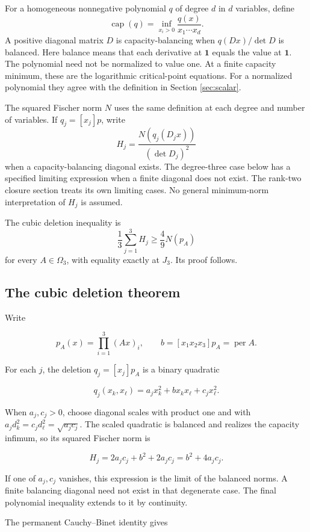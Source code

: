 \documentclass[11pt,a4paper]{article}
\theoremstyle{definition}
\theoremstyle{remark}
\begin{document}
For a homogeneous nonnegative polynomial \(q\) of degree \(d\) in \(d\)
variables, define \[
 \operatorname{cap}(q)=\inf_{x_i>0}\frac{q(x)}{x_1\cdots x_d}.
\] A positive diagonal matrix \(D\) is capacity-balancing when
\(q(Dx)/\det D\) is balanced. Here balance means that each derivative at
\(\mathbf1\) equals the value at \(\mathbf1\). The polynomial need not
be normalized to value one. At a finite capacity minimum, these are the
logarithmic critical-point equations. For a normalized polynomial they
agree with the definition in Section \ref{sec:scalar}.

The squared Fischer norm \(N\) uses the same definition at each degree and
number of variables. If \(q_j=[x_j]p\), write \[
 H_j=\frac{N(q_j(D_jx))}{(\det D_j)^2}
\] when a capacity-balancing diagonal exists. The degree-three case
below has a specified limiting expression when a finite diagonal does
not exist. The rank-two closure section treats its own limiting cases.
No general minimum-norm interpretation of \(H_j\) is assumed.

The cubic deletion inequality is \[
 \frac13\sum_{j=1}^3H_j\ge\frac49 N(p_A)
\] for every \(A\in\Omega_3\), with equality exactly at \(J_3\). Its proof follows.

\subsection{The cubic deletion
theorem}\label{deletion-the-cubic-deletion-theorem}

Write

\[
p_A(x)=\prod_{i=1}^3(Ax)_i,\qquad
b=[x_1x_2x_3]p_A=\operatorname{per}A.
\]

For each \(j\), the deletion \(q_j=[x_j]p_A\) is a binary quadratic

\[
q_j(x_k,x_\ell)=a_jx_k^2+b x_kx_\ell+c_jx_\ell^2.
\]

When \(a_j,c_j>0\), choose diagonal scales with product one and with
\(a_jd_k^2=c_jd_\ell^2=\sqrt{a_jc_j}\). The scaled quadratic is balanced
and realizes the capacity infimum, so its squared Fischer norm is

\[
H_j=2a_jc_j+b^2+2a_jc_j=b^2+4a_jc_j.
\]

If one of \(a_j,c_j\) vanishes, this expression is the limit of the
balanced norms. A finite balancing diagonal need not exist in that
degenerate case. The final polynomial inequality extends to it by
continuity.

The permanent Cauchy--Binet identity gives
\end{document}
